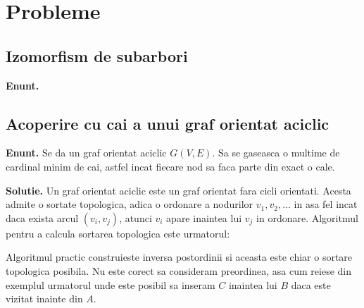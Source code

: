 \chapter{Probleme}

\section{Izomorfism de subarbori}

\hspace{1cm}

\noindent \textbf{Enunt.}

\pagebreak

\section{Acoperire cu cai a unui graf orientat aciclic}

\noindent \textbf{Enunt.} Se da un graf orientat aciclic $G(V, E)$. Sa se gaseasca o multime de cardinal minim de cai, astfel incat
fiecare nod sa faca parte din exact o cale.

\noindent \textbf{Solutie.} Un graf orientat aciclic este un graf orientat fara cicli orientati. Acesta admite o sortate topologica,
adica o ordonare a nodurilor $v_{1}, v_{2}, \ldots$ in asa fel incat daca exista arcul $(v_{i}, v_{j})$, atunci $v_{i}$ apare inaintea
lui $v_{j}$ in ordonare. Algoritmul pentru a calcula sortarea topologica este urmatorul:

\begin{algorithm}[H]
  \DontPrintSemicolon
  \;
\end{algorithm}

\begin{algorithm}[H]
  \DontPrintSemicolon
  \;
\end{algorithm}

\pagebreak

Algoritmul practic construieste inversa postordinii si aceasta este chiar o sortare topologica posibila.
Nu este corect sa consideram preordinea, asa cum reiese din exemplul urmatorul unde este posibil sa inseram $C$
inaintea lui $B$ daca este vizitat inainte din $A$.

